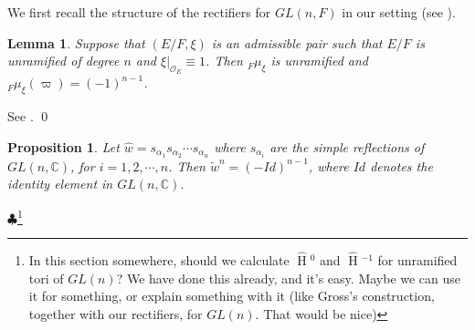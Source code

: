 \documentclass[11pt]{amsart}
\theoremstyle{plain}
\newtheorem{proposition}[theorem]{Proposition}
\newtheorem{lemma}[theorem]{Lemma}
\newcommand{\MAxxx}[1]{$\clubsuit$\footnote{#1}}
\newcommand{\HT}[1]{\hat{\HH}{}^{#1}}
\theoremstyle{definition}
\DeclareMathOperator{\HH}{H}
\begin{document}
We first recall the structure of the rectifiers for $GL(n,F)$ in our
setting (see \cite{bushnellhenniart}).

\begin{lemma}
  Suppose that $(E/F, \xi)$ is an admissible pair such that $E/F$ is
  unramified of degree $n$ and $\xi|_{\mathcal{O}_E} \equiv 1$.
  Then ${}_F \mu_{\xi}$ is unramified and
  ${}_F \mu_{\xi}(\varpi) = (-1)^{n-1}$.
\end{lemma}

\proof
See \cite[Proposition 21]{bushnellhenniart}.
\qed

\begin{proposition}
Let $\hat{w} = s_{\alpha_1} s_{\alpha_2} \cdots s_{\alpha_n}$ where
$s_{\alpha_i}$ are the simple reflections of $GL(n,\mathbb{C})$,
for $i = 1, 2, \cdots, n$.  Then $\tilde{w}^n = (-Id)^{n-1}$, where $Id$
denotes the identity element in $GL(n,\mathbb{C})$.
\end{proposition}

\MAxxx{In this section somewhere, should we calculate $\HT{0}$ and
  $\HT{-1}$ for unramified tori of $GL(n)$? We have done this
  already, and it's easy.  Maybe we can use it for something, or
  explain something with it (like Gross's construction, together with
  our rectifiers, for $GL(n)$.  That would be nice)}
\end{document}
